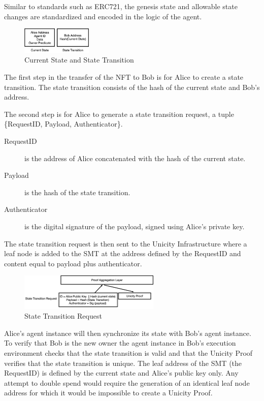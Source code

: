 \documentclass{article}
\begin{document}
 Similar to standards such as ERC721, the genesis state and allowable state changes are standardized and encoded in the logic of the agent.

\begin{figure}[htbp]
    \centering
    \includegraphics[width=0.3\textwidth]{CurrentStateAndStateTransition.png}
    \caption{Current State and State Transition}
    \label{fig:CurrentState}
\end{figure}



The first step in the transfer of the NFT to Bob is for Alice to create a state transition. The state transition consists of the hash of the current state and Bob's address.


The second step is for Alice to generate a state transition request, a tuple \{RequestID, Payload, Authenticator\}.

\begin{description}
    \item[RequestID] is the address of Alice concatenated with the hash of the current state.
    \item[Payload] is the hash of the state transition.
    \item [Authenticator] is the digital signature of the payload, signed using Alice’s private key.
\end{description}

The state transition request is then sent to the Unicity Infrastructure where a leaf node is added to the SMT at the address defined by the RequestID and content equal to payload plus authenticator.

\begin{figure}[H]
    \centering
    \includegraphics[width=0.6\textwidth]{STR.png}
    \caption{State Transition Request}
    \label{fig:STR}
\end{figure}

Alice's agent instance will then synchronize its state with Bob's agent instance. To verify that Bob is the new owner the agent instance in Bob's execution environment checks that the state transition is valid and that the Unicity Proof verifies that the state transition is unique. The leaf address of the SMT (the RequestID) is defined by the current state and Alice’s public key only.  Any attempt to double spend would require the generation of an identical leaf node address for which it would be impossible to create a Unicity Proof.
\end{document}
